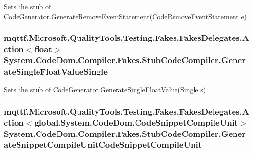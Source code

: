 Sets the stub of Code\-Generator.\-Generate\-Remove\-Event\-Statement(\-Code\-Remove\-Event\-Statement e)

\hypertarget{class_system_1_1_code_dom_1_1_compiler_1_1_fakes_1_1_stub_code_compiler_aa9ff03e40d5a74175b4f7314b2f8f155}{
\subsubsection[{Generate\-Single\-Float\-Value\-Single}]{\setlength{\rightskip}{0pt plus 5cm}mqttf.\-Microsoft.\-Quality\-Tools.\-Testing.\-Fakes.\-Fakes\-Delegates.\-Action$<$float$>$ System.\-Code\-Dom.\-Compiler.\-Fakes.\-Stub\-Code\-Compiler.\-Generate\-Single\-Float\-Value\-Single}}\label{class_system_1_1_code_dom_1_1_compiler_1_1_fakes_1_1_stub_code_compiler_aa9ff03e40d5a74175b4f7314b2f8f155}


Sets the stub of Code\-Generator.\-Generate\-Single\-Float\-Value(\-Single s)

\hypertarget{class_system_1_1_code_dom_1_1_compiler_1_1_fakes_1_1_stub_code_compiler_a583f9d353244d6675f70b91e108dc5fd}{
\subsubsection[{Generate\-Snippet\-Compile\-Unit\-Code\-Snippet\-Compile\-Unit}]{\setlength{\rightskip}{0pt plus 5cm}mqttf.\-Microsoft.\-Quality\-Tools.\-Testing.\-Fakes.\-Fakes\-Delegates.\-Action$<$global.\-System.\-Code\-Dom.\-Code\-Snippet\-Compile\-Unit$>$ System.\-Code\-Dom.\-Compiler.\-Fakes.\-Stub\-Code\-Compiler.\-Generate\-Snippet\-Compile\-Unit\-Code\-Snippet\-Compile\-Unit}}\label{class_system_1_1_code_dom_1_1_compiler_1_1_fakes_1_1_stub_code_compiler_a583f9d353244d6675f70b91e108dc5fd}


